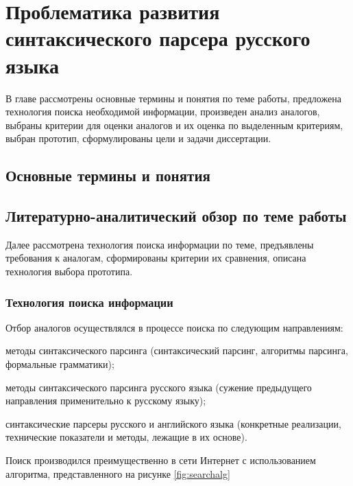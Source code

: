 \indent \section{Проблематика развития синтаксического парсера русского языка}
В главе рассмотрены основные термины и понятия по теме работы, предложена технология поиска необходимой информации, произведен анализ аналогов, выбраны критерии для оценки аналогов и их оценка по выделенным критериям, выбран прототип, сформулированы цели и задачи диссертации.

\subsection{Основные термины и понятия}

\subsection{Литературно-аналитический обзор по теме работы}
Далее рассмотрена технология поиска информации по теме, предъявлены требования к аналогам, сформированы критерии их сравнения, описана технология выбора прототипа.

\subsubsection{Технология поиска информации}
Отбор аналогов осуществлялся в процессе поиска по следующим направлениям:
\begin{list}{}{\leftmargin=1.5cm}
	\item методы синтаксического парсинга (синтаксический парсинг, алгоритмы парсинга, формальные грамматики);
	\item методы синтаксического парсинга русского языка (сужение предыдущего направления применительно к русскому языку);
	\item синтаксические парсеры русского и английского языка (конкретные реализации, технические показатели и методы, лежащие в их основе).
\end{list}

Поиск производился преимущественно в сети Интернет с использованием алгоритма, представленного на рисунке \ref{fig:searchalg}

